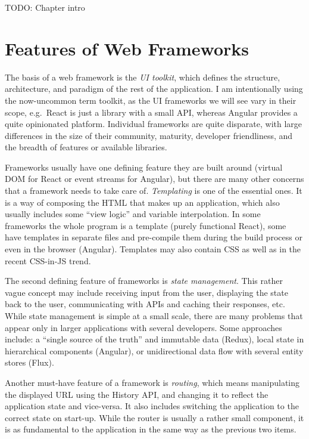 \documentclass[english,odsaz]{fitthesis}
\begin{document}
TODO: Chapter intro

\section{Features of Web Frameworks}
\label{sec:orge92de03}
The basis of a web framework is the \emph{UI toolkit}, which defines the structure,
architecture, and paradigm of the rest of the application. I am intentionally
using the now-uncommon term toolkit, as the UI frameworks we will see vary in
their scope, e.g.~React is just a library with a small API, whereas Angular
provides a quite opinionated platform. Individual frameworks are quite
disparate, with large differences in the size of their community, maturity,
developer friendliness, and the breadth of features or available libraries.

Frameworks usually have one defining feature they are built around (virtual DOM
for React or event streams for Angular), but there are many other concerns that
a framework needs to take care of. \emph{Templating} is one of the essential ones. It
is a way of composing the HTML that makes up an application, which also usually
includes some ``view logic'' and variable interpolation. In some frameworks the
whole program is a template (purely functional React), some have templates in
separate files and pre-compile them during the build process or even in the
browser (Angular). Templates may also contain CSS as well as in the recent
CSS-in-JS trend.

The second defining feature of frameworks is \emph{state management}. This rather vague
concept may include receiving input from the user, displaying the state back to
the user, communicating with APIs and caching their responses, etc. While state
management is simple at a small scale, there are many problems that appear only
in larger applications with several developers. Some approaches include: a
``single source of the truth'' and immutable data (Redux), local state in
hierarchical components (Angular), or unidirectional data flow with several
entity stores (Flux).

Another must-have feature of a framework is \emph{routing}, which means manipulating
the displayed URL using the History API, and changing it to reflect the
application state and vice-versa. It also includes switching the application to
the correct state on start-up. While the router is usually a rather small
component, it is as fundamental to the application in the same way as the previous two
items.
\end{document}
